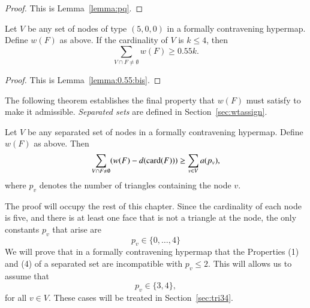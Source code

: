 \begin{proof} This is Lemma~\ref{lemma:pq}.
\end{proof}

\begin{lemma} Let $V$ be any set of nodes of type $(5,0,0)$ in a
formally contravening hypermap.  Define $w(F)$ as above.
        If the cardinality of $V$ is $k\le 4$,
        then
        $$\sum_{V\cap F\ne\emptyset} w(F) \ge 0.55 k.$$
\end{lemma}

\begin{proof} This is Lemma~\ref{lemma:0.55:bis}.
\end{proof}

The following theorem establishes the final property that $w(F)$
must satisfy to make it admissible.  {\it Separated sets\/} are
defined in Section~\ref{sec:wtassign}.

\begin{theorem}
        \label{proposition:excess}
        Let $V$ be any separated set of nodes in a formally contravening hypermap.
        Define $w(F)$ as above.
        Then
        $$\sum_{V\cap F\ne\emptyset} (w(F) -d({\operatorname{card}}(F)))
            \ge \sum_{v\in V} a(p_v),$$
        where $p_v$ denotes the number of triangles containing
        the node $v$.
\end{theorem}

The proof will occupy the rest of this chapter. Since the cardinality
of each node is five, and there is at least one face that is not a
triangle at the node, the only constants $p_v$ that arise are
    $$p_v \in\{0,\ldots,4\}$$
We will prove that in a formally contravening hypermap that the
Properties (1) and (4) of a separated set are incompatible with
$p_v\le 2$.  This will allows us to assume that
$$p_v\in\{3,4\},$$ for all $v\in V$.  These cases will be treated in
Section~\ref{sec:tri34}.

